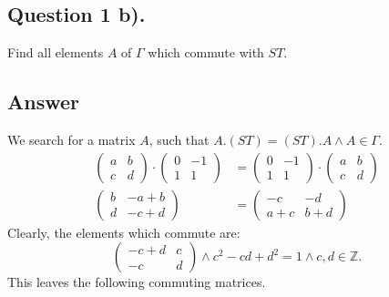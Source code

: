 \subsection{Question 1 b).}
\noindent
Find all elements $A$ of $\Gamma$ which commute with $ST$.

\subsection*{Answer}
\noindent
We search for a matrix $A$, such that $A.(ST) = (ST).A \wedge A \in \Gamma$.
\begin{align*}
    \begin{pmatrix}
        a & b\\
        c & d
    \end{pmatrix} \cdot
    \begin{pmatrix}
        0 & -1\\
        1 & 1
    \end{pmatrix}
    &=
    \begin{pmatrix}
        0 & -1\\
        1 & 1
    \end{pmatrix} \cdot
    \begin{pmatrix}
        a & b\\
        c & d
    \end{pmatrix} \\
    \begin{pmatrix}
        b & -a+b\\
        d & -c+d
    \end{pmatrix}
    &=
    \begin{pmatrix}
        -c & -d\\
        a+c & b+d
    \end{pmatrix}
\end{align*}
Clearly, the elements which commute are:
\[
    \begin{pmatrix}
        -c+d & c\\
        -c & d
    \end{pmatrix}
    \wedge c^2 -c d + d^2 = 1 \wedge c,d \in \mathbb{Z}.
\]
This leaves the following commuting matrices.

